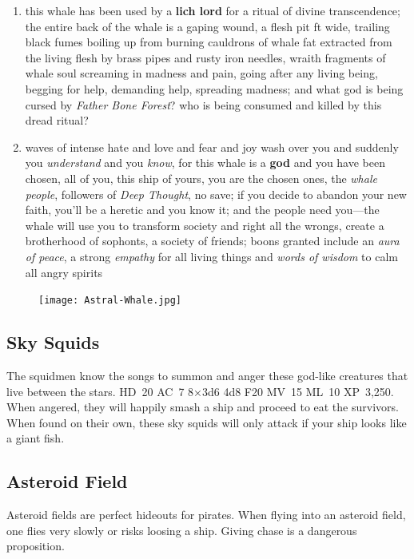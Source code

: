 \documentclass[11pt]{bxart}
\begin{document}
\begin{enumerate}
\item this whale has been used by a \textbf{lich lord} for a ritual of
  divine transcendence; the entire back of the whale is a gaping
  wound, a flesh pit \unit[500]{ft} wide, trailing black fumes boiling
  up from burning cauldrons of whale fat extracted from the living
  flesh by brass pipes and rusty iron needles, wraith fragments of
  whale soul screaming in madness and pain, going after any living
  being, begging for help, demanding help, spreading madness; and what
  god is being cursed by \textit{Father Bone Forest}? who is being
  consumed and killed by this dread ritual?

\item waves of intense hate and love and fear and joy wash over you
  and suddenly you \textit{understand} and you \textit{know}, for this
  whale is a \textbf{god} and you have been chosen, all of you, this
  ship of yours, you are the chosen ones, the \textit{whale people},
  followers of \textit{Deep Thought}, no save; if you decide to
  abandon your new faith, you'll be a heretic and you know it; and the
  people need you—the whale will use you to transform society and
  right all the wrongs, create a brotherhood of sophonts, a society of
  friends; boons granted include an \textit{aura of peace}, a strong
  \textit{empathy} for all living things and \textit{words of wisdom}
  to calm all angry spirits
\end{enumerate}

\begin{figure}[h]
  \centering
  \texttt{[image: Astral-Whale.jpg]}
\end{figure}

\subsection{Sky Squids}

The squidmen know the songs to summon and anger these god-like
creatures that live between the stars. HD~20 AC~7 8×3d6 4d8 F20 MV~15
ML~10 XP~3,250. When angered, they will happily smash a ship and
proceed to eat the survivors. When found on their own, these sky
squids will only attack if your ship looks like a giant fish.

\subsection{Asteroid Field}

Asteroid fields are perfect hideouts for pirates. When flying into an
asteroid field, one flies very slowly or risks loosing a ship. Giving
chase is a dangerous proposition.
\end{document}
